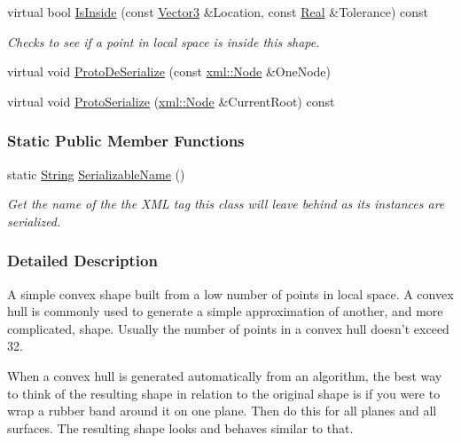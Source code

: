 \begin{DoxyCompactItemize}
virtual bool \hyperlink{classMezzanine_1_1ConvexHullCollisionShape_a6aa3c6afad74091dec9c933eef257301}{IsInside} (const \hyperlink{classMezzanine_1_1Vector3}{Vector3} \&Location, const \hyperlink{namespaceMezzanine_a726731b1a7df72bf3583e4a97282c6f6}{Real} \&Tolerance) const 
\begin{DoxyCompactList}\small\item\em Checks to see if a point in local space is inside this shape. \item\end{DoxyCompactList}\item 
virtual void \hyperlink{classMezzanine_1_1ConvexHullCollisionShape_a3ad727374ebb82699f8dae7344139add}{ProtoDeSerialize} (const \hyperlink{classMezzanine_1_1xml_1_1Node}{xml::Node} \&OneNode)
\item 
virtual void \hyperlink{classMezzanine_1_1ConvexHullCollisionShape_a60a91d12cc13b8886e6feaddeb32e556}{ProtoSerialize} (\hyperlink{classMezzanine_1_1xml_1_1Node}{xml::Node} \&CurrentRoot) const 
\end{DoxyCompactItemize}
\subsubsection*{Static Public Member Functions}
\begin{DoxyCompactItemize}
\item 
static \hyperlink{namespaceMezzanine_acf9fcc130e6ebf08e3d8491aebcf1c86}{String} \hyperlink{classMezzanine_1_1ConvexHullCollisionShape_a58cda94bb88fd44976747e0600b2356f}{SerializableName} ()
\begin{DoxyCompactList}\small\item\em Get the name of the the XML tag this class will leave behind as its instances are serialized. \item\end{DoxyCompactList}\end{DoxyCompactItemize}


\subsubsection{Detailed Description}
A simple convex shape built from a low number of points in local space. A convex hull is commonly used to generate a simple approximation of another, and more complicated, shape. Usually the number of points in a convex hull doesn't exceed 32. \par
 \par
 When a convex hull is generated automatically from an algorithm, the best way to think of the resulting shape in relation to the original shape is if you were to wrap a rubber band around it on one plane. Then do this for all planes and all surfaces. The resulting shape looks and behaves similar to that. 

